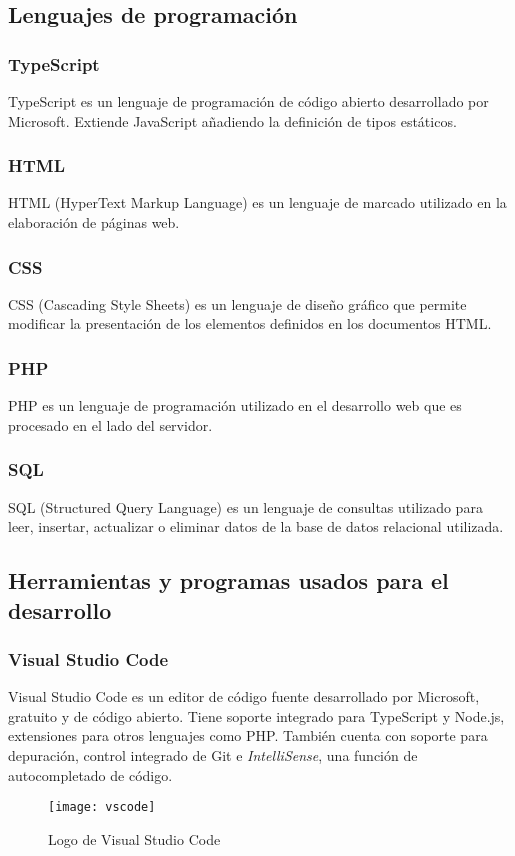 \subsection{Lenguajes de programación}
\subsubsection{TypeScript}
TypeScript es un lenguaje de programación de código abierto desarrollado por Microsoft. Extiende JavaScript añadiendo la definición de tipos estáticos.
\subsubsection{HTML}
HTML (HyperText Markup Language) es un lenguaje de marcado utilizado en la elaboración de páginas web.
\subsubsection{CSS}
CSS (Cascading Style Sheets) es un lenguaje de diseño gráfico que permite modificar la presentación de los elementos definidos en los documentos HTML.
\subsubsection{PHP}
PHP es un lenguaje de programación utilizado en el desarrollo web que es procesado en el lado del servidor.
\subsubsection{SQL}
SQL (Structured Query Language) es un lenguaje de consultas utilizado para leer, insertar, actualizar o eliminar datos de la base de datos relacional utilizada. 
\subsection{Herramientas y programas usados para el desarrollo}
\subsubsection{Visual Studio Code}
Visual Studio Code es un editor de código fuente desarrollado por Microsoft, gratuito y de código abierto. Tiene soporte integrado para TypeScript y Node.js, extensiones para otros lenguajes como PHP. También cuenta con soporte para depuración, control integrado de Git e \textit{IntelliSense}, una función de autocompletado de código\cite{VSCode}.
\begin{figure}[H]
	\centering
	\texttt{[image: vscode]}
	\caption{Logo de Visual Studio Code}
\end{figure}
